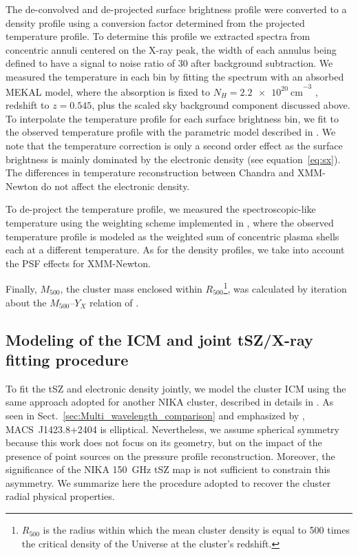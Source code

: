 \documentclass[twocolumn,traditabstract]{aa}
\begin{document}
The de-convolved and de-projected surface brightness profile were converted to a density profile using a conversion factor determined from the projected temperature profile. To determine this profile we extracted spectra from concentric annuli centered on the X-ray peak, the width of each annulus being defined to have a signal to noise ratio of $30$ after background subtraction. We measured the temperature in each bin by fitting the spectrum with an absorbed MEKAL model, where the absorption is fixed to $N_{H}=\SI{2.2e20}{\centi\meter}^{-3}$ \citep{kalberla2005}, redshift to $z=0.545$, plus the scaled sky background component discussed above. To interpolate the temperature profile for each surface brightness bin, we fit to the observed temperature profile with the parametric model described in \cite{vikhlinin2006}. We note that the temperature correction is only a second order effect as the surface brightness is mainly dominated by the electronic density (see equation~\ref{eq:sx}). The differences in temperature reconstruction between Chandra and XMM-Newton do not affect the electronic density.

To de-project the temperature profile, we measured the spectroscopic-like temperature \citep{mazzotta2004} using the weighting scheme implemented in \cite{vikh_multit}, where the observed temperature profile is modeled as the weighted sum of concentric plasma shells each at a different temperature. As for the density profiles, we take into account the PSF effects for XMM-Newton. 

Finally, $M_{500}$, the cluster mass enclosed within $R_{500}$\footnote{$R_{500}$ is the radius within which the mean cluster density is equal to 500 times the critical density of the Universe at the cluster's redshift.}, was calculated by iteration about the $M_{500}$--$Y_X$ relation of \cite{arnaud2010}.

\subsection{Modeling of the ICM and joint tSZ/X-ray fitting procedure}\label{sec:modeling}
To fit the tSZ and electronic density jointly, we model the cluster ICM using the same approach adopted for another NIKA cluster, described in details in \cite{adam2014}. As seen in Sect.~\ref{sec:Multi_wavelength_comparison} and emphasized by \cite{morandi2010}, \mbox{MACS~J1423.8+2404} is elliptical. Nevertheless, we assume spherical symmetry because this work does not focus on its geometry, but on the impact of the presence of point sources on the pressure profile reconstruction. Moreover, the significance of the NIKA 150~GHz tSZ map is not sufficient to constrain this asymmetry. We summarize here the procedure adopted to recover the cluster radial physical properties.
\end{document}
